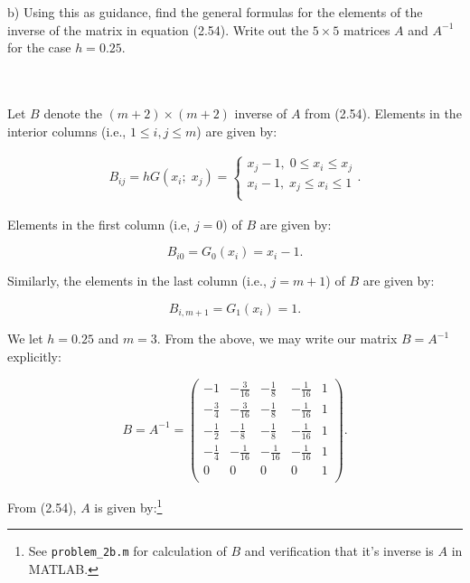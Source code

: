 \pagebreak
b) Using this as guidance, find the general formulas for the elements of the inverse of the matrix in equation (2.54).
   Write out the $5 \times 5$ matrices $A$ and $A^{-1}$ for the case $h = 0.25$.

\begin{solution}\ \\\\
    Let $B$ denote the $(m+2) \times (m+2)$ inverse of $A$ from (2.54). Elements in the interior columns 
    (i.e., $1 \le i,j \le m$) are given by:

    \begin{align*}
    B_{ij} = hG(x_i;\; x_j) = \begin{cases}
                                x_j - 1,\; 0 \le x_i \le x_j \\
                                x_i - 1,\; x_j \le x_i \le 1 \\
                            \end{cases}.
    \end{align*}

    Elements in the first column (i.e, $j = 0$) of $B$ are given by:

    $$
    B_{i0} = G_0(x_i) = x_i - 1.
    $$

    Similarly, the elements in the last column (i.e., $j = m + 1$) of $B$ are given by:

    $$
    B_{i,m+1} = G_1(x_i) = 1.
    $$

    We let $h = 0.25$ and $m = 3$. From the above, we may write our matrix $B = A^{-1}$ explicitly:


    \begingroup
    \renewcommand*{\arraystretch}{1.5}
    $$
        B =A^{-1} =
        \begin{pmatrix}
                      -1 & -\frac{3}{16} &  -\frac{1}{8} & -\frac{1}{16} & 1 \\
            -\frac{3}{4} & -\frac{3}{16} &  -\frac{1}{8} & -\frac{1}{16} & 1 \\
            -\frac{1}{2} &  -\frac{1}{8} &  -\frac{1}{8} & -\frac{1}{16} & 1 \\
            -\frac{1}{4} & -\frac{1}{16} & -\frac{1}{16} & -\frac{1}{16} & 1 \\
                       0 &             0 &             0 &             0 & 1 \\
        \end{pmatrix}.
    $$
    \endgroup

    From (2.54), $A$ is given by:\footnote{
        See \texttt{problem\_2b.m} for calculation of $B$ and verification that it's inverse is $A$ in MATLAB.
    }


\end{solution}

